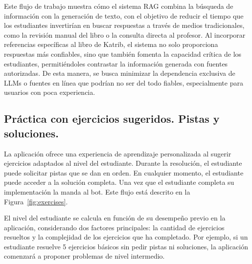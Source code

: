 \documentclass{article}
\begin{document}
Este flujo de trabajo muestra cómo el sistema RAG combina la búsqueda de información con la generación de texto, con el objetivo de reducir el tiempo que los estudiantes invertirían en buscar respuestas a través de medios tradicionales, como la revisión manual del libro o la consulta directa al profesor. Al incorporar referencias específicas al libro de Katrib, el sistema no solo proporciona respuestas más confiables, sino que también fomenta la capacidad crítica de los estudiantes, permitiéndoles contrastar la información generada con fuentes autorizadas. De esta manera, se busca minimizar la dependencia exclusiva de LLMs o fuentes en línea que podrían no ser del todo fiables, especialmente para usuarios con poca experiencia.

\subsection{Práctica con ejercicios sugeridos. Pistas y soluciones.}

La aplicación ofrece una experiencia de aprendizaje personalizada al sugerir ejercicios adaptados al nivel del estudiante. Durante la resolución, el estudiante puede solicitar pistas que se dan en orden. En cualquier momento, el estudiante puede acceder a la solución completa. Una vez que el estudiante completa su implementación la manda al bot. Este flujo está descrito en la Figura~\ref{fig:exercises}.

El nivel del estudiante se calcula en función de su desempeño previo en la aplicación, considerando dos factores principales: la cantidad de ejercicios resueltos y la complejidad de los ejercicios que ha completado. Por ejemplo, si un estudiante resuelve 5 ejercicios básicos sin pedir pistas ni soluciones, la aplicación comenzará a proponer problemas de nivel intermedio.
\end{document}
